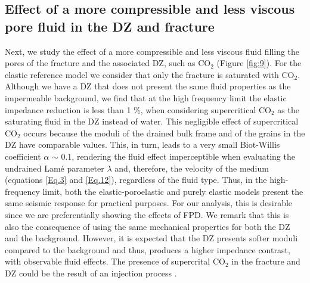 \documentclass[draft]{agujournal2019}
\begin{document}

\subsection{Effect of a more compressible and less viscous pore fluid in the DZ and fracture}
Next, we study the effect of a more compressible and less viscous fluid filling the pores of the fracture and the associated DZ, such as CO$_2$ (Figure \ref{fig:9}). For the elastic reference model we consider that only the fracture is saturated with
CO$_2$. Although  we have a DZ that does not present the same fluid properties as the impermeable background, we find that at the high frequency limit the elastic impedance reduction is less than 1 \%, when considering  supercritical CO$_2$ as the saturating fluid in the DZ instead of water. This negligible effect of supercritical CO$_2$ occurs because the moduli of the drained bulk frame and of the grains in the DZ have
comparable values. This, in turn, leads to a very small Biot-Willis coefficient $\alpha$ $\sim$ 0.1, rendering the fluid effect imperceptible when evaluating the undrained Lamé parameter $\lambda$ and, therefore, the velocity of the medium (equations \ref{Eq.3} and \ref{Eq.12}), regardless of the fluid type.
Thus, in the high-frequency limit, both the elastic-poroelastic and purely elastic models present the same seismic response for practical purposes. For our analysis, this is desirable since we are preferentially showing the effects of FPD.
We remark that this is also the consequence of using the same mechanical properties for both the DZ and the background. However, it is expected that the DZ presents softer moduli compared to the background and thus, produces a higher impedance contrast, with observable fluid effects. The presence of supercrital CO$_2$ in the fracture and DZ could be the result of an injection process \cite{Lumley2010}. 
\end{document}
